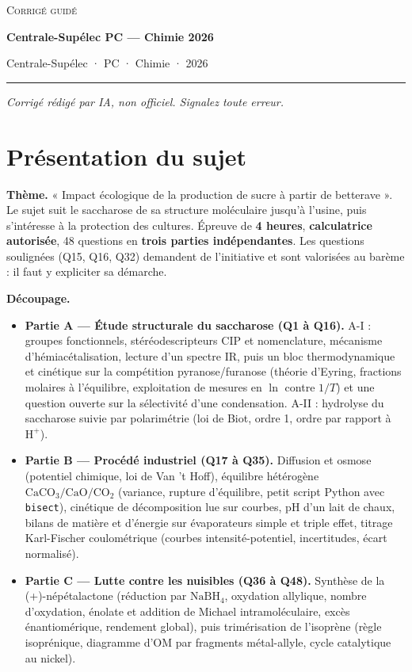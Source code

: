 \documentclass[11pt,a4paper]{article}
\providecommand{\tightlist}{\setlength{\itemsep}{0pt}\setlength{\parskip}{0pt}}
\begin{document}
\thispagestyle{plain}
\begin{center}
  {\small\scshape Corrigé guidé}\par\smallskip
  {\LARGE\bfseries Centrale-Supélec PC — Chimie 2026\par}\medskip
  {\large Centrale-Supélec · PC · Chimie · 2026\par}
\end{center}
\vspace{2pt}\hrule\vspace{8pt}

\emph{Corrigé rédigé par IA, non officiel. Signalez toute erreur.}

\hypertarget{pruxe9sentation-du-sujet}{%
\section{Présentation du sujet}\label{pruxe9sentation-du-sujet}}

\textbf{Thème.} « Impact écologique de la production de sucre à partir de betterave ». Le sujet suit le saccharose de sa structure moléculaire jusqu'à l'usine, puis s'intéresse à la protection des cultures. Épreuve de \textbf{4 heures}, \textbf{calculatrice autorisée}, 48 questions en \textbf{trois parties indépendantes}. Les questions soulignées (Q15, Q16, Q32) demandent de l'initiative et sont valorisées au barème : il faut y expliciter sa démarche.

\textbf{Découpage.}

\begin{itemize}
\tightlist
\item
  \textbf{Partie A --- Étude structurale du saccharose (Q1 à Q16).} A-I : groupes fonctionnels, stéréodescripteurs CIP et nomenclature, mécanisme d'hémiacétalisation, lecture d'un spectre IR, puis un bloc thermodynamique et cinétique sur la compétition pyranose/furanose (théorie d'Eyring, fractions molaires à l'équilibre, exploitation de mesures en \(\ln\) contre \(1/T\)) et une question ouverte sur la sélectivité d'une condensation. A-II : hydrolyse du saccharose suivie par polarimétrie (loi de Biot, ordre 1, ordre par rapport à \(\mathrm{H^+}\)).
\item
  \textbf{Partie B --- Procédé industriel (Q17 à Q35).} Diffusion et osmose (potentiel chimique, loi de Van 't Hoff), équilibre hétérogène \(\mathrm{CaCO_3/CaO/CO_2}\) (variance, rupture d'équilibre, petit script Python avec \texttt{bisect}), cinétique de décomposition lue sur courbes, pH d'un lait de chaux, bilans de matière et d'énergie sur évaporateurs simple et triple effet, titrage Karl-Fischer coulométrique (courbes intensité-potentiel, incertitudes, écart normalisé).
\item
  \textbf{Partie C --- Lutte contre les nuisibles (Q36 à Q48).} Synthèse de la (+)-népétalactone (réduction par \(\mathrm{NaBH_4}\), oxydation allylique, nombre d'oxydation, énolate et addition de Michael intramoléculaire, excès énantiomérique, rendement global), puis trimérisation de l'isoprène (règle isoprénique, diagramme d'OM par fragments métal-allyle, cycle catalytique au nickel).
\end{itemize}
\end{document}
